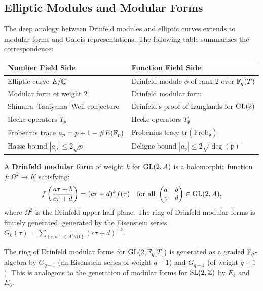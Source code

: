 \subsection{Elliptic Modules and Modular Forms}

The deep analogy between Drinfeld modules and elliptic curves extends to modular forms and Galois representations. The following table summarizes the correspondence:

\begin{center}
\begin{tabular}{|p{7cm}|p{7cm}|}
\hline
\textbf{Number Field Side} & \textbf{Function Field Side} \\ \hline
Elliptic curve $E/\mathbb{Q}$ & Drinfeld module $\phi$ of rank 2 over $\mathbb{F}_q(T)$ \\ \hline
Modular form of weight 2 & Drinfeld modular form \\ \hline
Shimura--Taniyama--Weil conjecture & Drinfeld's proof of Langlands for $\operatorname{GL}(2)$ \\ \hline
Hecke operators $T_p$ & Hecke operators $T_{\mathfrak{p}}$ \\ \hline
Frobenius trace $a_p = p + 1 - \#E(\mathbb{F}_p)$ & Frobenius trace $\mathrm{tr}(\mathrm{Frob}_{\mathfrak{p}})$ \\ \hline
Hasse bound $|a_p| \leq 2\sqrt{p}$ & Deligne bound $|a_{\mathfrak{p}}| \leq 2\sqrt{\deg(\mathfrak{p})}$ \\ \hline
\end{tabular}
\end{center}

\begin{definition}
A \textbf{Drinfeld modular form} of weight $k$ for $\operatorname{GL}(2, A)$ is a holomorphic function $f: \Omega^2 \to \overline{K}$ satisfying:
\[
f\left(\frac{a\tau + b}{c\tau + d}\right) = (c\tau + d)^k f(\tau) \quad \text{for all } \begin{pmatrix} a & b \\ c & d \end{pmatrix} \in \operatorname{GL}(2, A),
\]
where $\Omega^2$ is the Drinfeld upper half-plane. The ring of Drinfeld modular forms is finitely generated, generated by the Eisenstein series $G_k(\tau) = \sum_{(c,d) \in A^2 \setminus \{0\}} (c\tau + d)^{-k}$.
\end{definition}

\begin{theorem}[Goss, 1980]
The ring of Drinfeld modular forms for $\operatorname{GL}(2, \mathbb{F}_q[T])$ is generated as a graded $\mathbb{F}_q$-algebra by $G_{q-1}$ (an Eisenstein series of weight $q-1$) and $G_{q+1}$ (of weight $q+1$). This is analogous to the generation of modular forms for $\operatorname{SL}(2, \mathbb{Z})$ by $E_4$ and $E_6$.
\end{theorem}

